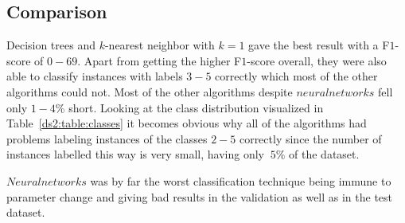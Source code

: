\subsection{Comparison}
Decision trees and $k$-nearest neighbor with $k=1$ gave the best result with a F$1$-score of $0-69$. Apart from getting the higher F$1$-score overall, they were also able to classify instances with labels $3-5$ correctly which most of the other algorithms could not. Most of the other algorithms despite $neural networks$ fell only	$1-4\%$ short.
Looking at the class distribution visualized in Table~\ref{ds2:table:classes} it becomes obvious why all of the algorithms had problems labeling instances of the classes $2-5$ correctly since the number of instances labelled this way is very small, having only $~5\%$ of the dataset.
\par $Neural networks$ was by far the worst classification technique being immune to parameter change and giving bad results in the validation as well as in the test dataset.
\label{ds2:sec:comparison}
